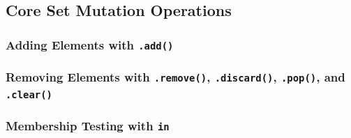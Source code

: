 \subsection{Core Set Mutation Operations}
\subsubsection{Adding Elements with \texttt{.add()}}
\subsubsection{Removing Elements with \texttt{.remove()}, \texttt{.discard()}, \texttt{.pop()}, and \texttt{.clear()}}
\subsubsection{Membership Testing with \texttt{in}}
